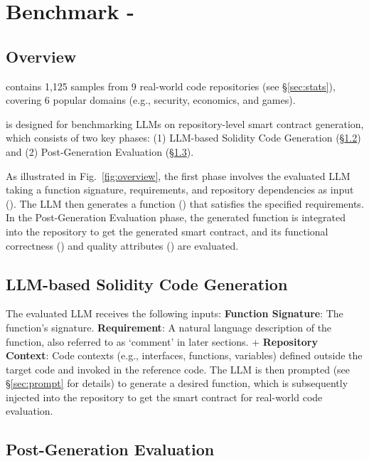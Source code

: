 \section{Benchmark - \datasetname}

\subsection{Overview}

\datasetname contains 1,125 samples from 9 real-world code repositories (see \S\ref{sec:stats}), covering 6 popular domains (e.g., security, economics, and games). 

\datasetname is designed for benchmarking LLMs on repository-level smart contract generation, which consists of two key phases: (1) LLM-based Solidity Code Generation (\S\ref{sec:llm_cg}) and (2) Post-Generation Evaluation (\S\ref{sec:eval_metrics}).


As illustrated in Fig.~\ref{fig:overview}, the first phase involves the evaluated LLM taking a function signature, requirements, and repository dependencies as input (). 
The LLM then generates a function () that satisfies the specified requirements.
In the Post-Generation Evaluation phase, the generated function is integrated into the repository to get the generated smart contract, and its functional correctness () and quality attributes () are evaluated.


\subsection{LLM-based Solidity Code Generation}
\label{sec:llm_cg}

The evaluated LLM receives the following inputs:  \textbf{Function Signature}: The function's signature.  \textbf{Requirement}: A natural language description of the function, also referred to as `comment' in later sections.  +  \textbf{Repository Context}: Code contexts (e.g., interfaces, functions, variables) defined outside the target code and invoked in the reference code. 
The LLM is then prompted (see \S\ref{sec:prompt} for details) to generate a desired function, which is subsequently injected into the repository to get the smart contract for real-world code evaluation.

\subsection{Post-Generation Evaluation}
\label{sec:eval_metrics}

